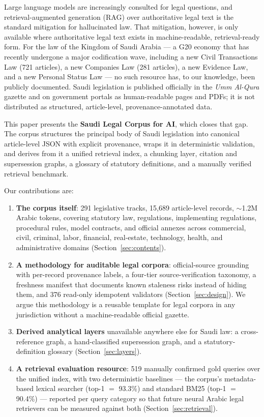 \documentclass[11pt]{article}
\newcommand{\corpusname}{Saudi Legal Corpus for AI}
\begin{document}
Large language models are increasingly consulted for legal questions, and
retrieval-augmented generation (RAG) over authoritative legal text is the
standard mitigation for hallucinated law. That mitigation, however, is only
available where authoritative legal text exists in machine-readable,
retrieval-ready form. For the law of the Kingdom of Saudi Arabia --- a G20
economy that has recently undergone a major codification wave, including a
new Civil Transactions Law (721 articles), a new Companies Law (281
articles), a new Evidence Law, and a new Personal Status Law --- no such
resource has, to our knowledge, been publicly documented. Saudi legislation is published
officially in the \emph{Umm Al-Qura} gazette and on government portals as
human-readable pages and PDFs; it is not distributed as structured,
article-level, provenance-annotated data.

This paper presents the \textbf{\corpusname}, which closes that gap. The
corpus structures the principal body of Saudi legislation into canonical
article-level JSON with explicit provenance, wraps it in deterministic
validation, and derives from it a unified retrieval index, a chunking layer,
citation and supersession graphs, a glossary of statutory definitions, and a
manually verified retrieval benchmark.

Our contributions are:

\begin{enumerate}
  \item \textbf{The corpus itself}: 291 legislative tracks, 15{,}689
    article-level records, $\sim$1.2M Arabic tokens, covering statutory law,
    regulations, implementing regulations, procedural rules, model
    contracts, and official annexes across commercial, civil, criminal,
    labor, financial, real-estate, technology, health, and administrative
    domains (Section~\ref{sec:contents}).
  \item \textbf{A methodology for auditable legal corpora}: official-source
    grounding with per-record provenance labels, a four-tier
    source-verification taxonomy, a freshness manifest that documents known
    staleness risks instead of hiding them, and 376 read-only idempotent
    validators (Section~\ref{sec:design}). We argue this methodology is a
    reusable template for legal corpora in any jurisdiction without a
    machine-readable official gazette.
  \item \textbf{Derived analytical layers} unavailable anywhere else for
    Saudi law: a cross-reference graph, a hand-classified supersession
    graph, and a statutory-definition glossary
    (Section~\ref{sec:layers}).
  \item \textbf{A retrieval evaluation resource}: 519 manually confirmed
    gold queries over the unified index, with two deterministic baselines
    --- the corpus's metadata-based lexical searcher (top-1 $=$ 93.3\%) and
    standard BM25 (top-1 $=$ 90.4\%) --- reported per query category so
    that future neural Arabic legal retrievers can be measured against both
    (Section~\ref{sec:retrieval}).
\end{enumerate}
\end{document}
